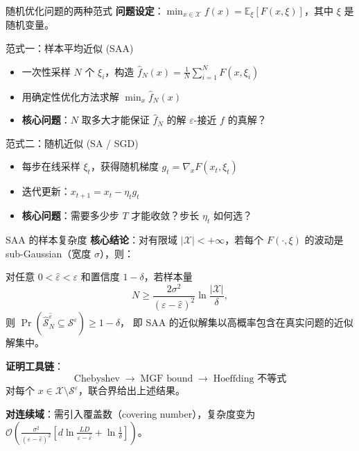 \documentclass[aspectratio=169,10pt]{ctexbeamer}
\newcommand{\E}{\mathbb{E}}
\newcommand{\grad}{\nabla}
\begin{document}
\begin{frame}{随机优化问题的两种范式}
\textbf{问题设定}：$\min_{x\in\mathcal{X}} f(x) = \E_\xi[F(x,\xi)]$，其中 $\xi$ 是随机变量。

\vspace{0.3cm}
\begin{block}{范式一：样本平均近似 (SAA)}
  \begin{itemize}
    \item 一次性采样 $N$ 个 $\xi_i$，构造 $\hat f_N(x)=\frac1N\sum_{i=1}^N F(x,\xi_i)$
    \item 用确定性优化方法求解 $\min_x \hat f_N(x)$
    \item \textbf{核心问题}：$N$ 取多大才能保证 $\hat f_N$ 的解 $\varepsilon$-接近 $f$ 的真解？
  \end{itemize}
\end{block}

\vspace{0.2cm}
\begin{block}{范式二：随机近似 (SA / SGD)}
  \begin{itemize}
    \item 每步在线采样 $\xi_t$，获得随机梯度 $g_t = \grad_x F(x_t,\xi_t)$
    \item 迭代更新：$x_{t+1} = x_t - \eta_t g_t$
    \item \textbf{核心问题}：需要多少步 $T$ 才能收敛？步长 $\eta_t$ 如何选？
  \end{itemize}
\end{block}
\end{frame}

\begin{frame}{SAA 的样本复杂度}
\textbf{核心结论}：对有限域 $|\mathcal{X}|<+\infty$，若每个 $F(\cdot,\xi)$ 的波动是 sub-Gaussian（宽度 $\sigma$），则：

\begin{theorem}
  对任意 $0<\hat\varepsilon<\varepsilon$ 和置信度 $1-\delta$，若样本量
  \[
    N \ge \frac{2\sigma^2}{(\varepsilon-\hat\varepsilon)^2}\ln\frac{|\mathcal{X}|}{\delta},
  \]
  则 $\Pr(\hat{\mathcal{S}}_N^{\hat\varepsilon}\subseteq \mathcal{S}^\varepsilon)\ge 1-\delta$，
  即 SAA 的近似解集以高概率包含在真实问题的近似解集中。
\end{theorem}

\vspace{0.2cm}
\textbf{证明工具链}：
\[
  \text{Chebyshev} \;\to\; \text{MGF bound} \;\to\; \text{Hoeffding 不等式}
\]
对每个 $x\in\mathcal{X}\setminus\mathcal{S}^\varepsilon$，联合界给出上述结果。

\textbf{对连续域}：需引入覆盖数（covering number），复杂度变为
$\mathcal{O}\!\left(\frac{\sigma^2}{(\varepsilon-\hat\varepsilon)^2}\left[d\ln\frac{LD}{\varepsilon-\hat\varepsilon}+\ln\frac{1}{\delta}\right]\right)$。
\end{frame}
\end{document}
